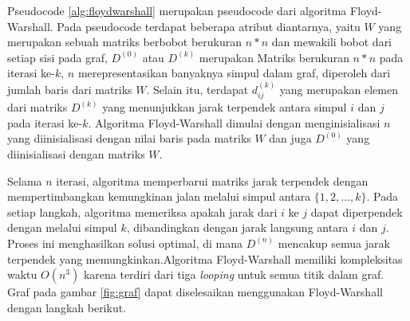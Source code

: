 Pseudocode \ref{alg:floydwarshall} merupakan pseudocode dari algoritma Floyd-Warshall. Pada pseudocode terdapat beberapa atribut diantarnya, yaitu $W$ yang merupakan sebuah matriks berbobot berukuran $n*n$ dan mewakili bobot dari setiap sisi pada graf, $D^{(0)}$ atau $D^{(k)}$ merupakan Matriks berukuran $n*n$ pada iterasi ke-$k$, $n$ merepresentasikan banyaknya simpul dalam graf, diperoleh dari jumlah baris dari matriks $W$. Selain itu, terdapat $d_{ij}^{(k)}$ yang merupakan elemen dari matriks $D^{(k)}$ yang menunjukkan jarak terpendek antara simpul $i$ dan $j$ pada iterasi ke-$k$. Algoritma Floyd-Warshall dimulai dengan menginisialisasi $n$ yang diinisialisasi dengan nilai baris pada matriks $W$ dan juga $D^{(0)}$ yang diinisialisasi dengan matriks $W$. 

Selama $n$ iterasi, algoritma memperbarui matriks jarak terpendek dengan mempertimbangkan kemungkinan jalan melalui simpul antara $\{1,2,...,k\}$. Pada setiap langkah, algoritma memeriksa apakah jarak dari $i$ ke $j$ dapat diperpendek dengan melalui simpul $k$, dibandingkan dengan jarak langsung antara $i$ dan $j$. Proses ini menghasilkan solusi optimal, di mana $D^{(n)}$ mencakup semua jarak terpendek yang memungkinkan.Algoritma Floyd-Warshall memiliki kompleksitas waktu $O(n^3)$ karena terdiri dari tiga \textit{looping} untuk semua titik dalam graf.
\\
Graf pada gambar \ref{fig:graf} dapat diselesaikan menggunakan Floyd-Warshall dengan langkah berikut.
